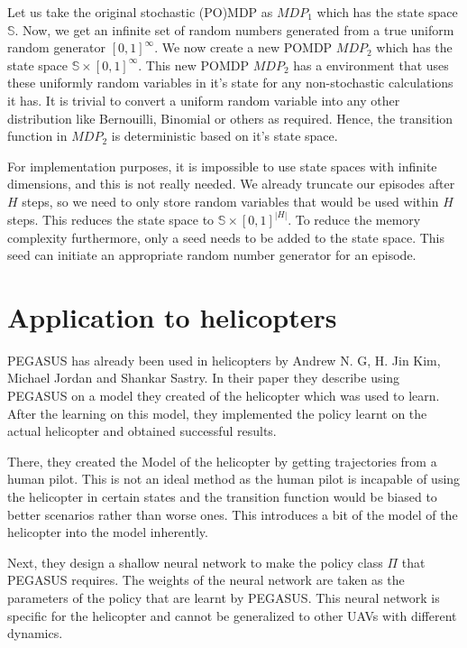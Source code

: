 \documentclass[BTech]{iitmdiss}
\begin{document}
Let us take the original stochastic (PO)MDP as $MDP_{1}$ which has the state space $\mathbb{S}$. Now, we get an infinite set of random numbers generated from a true uniform random generator $[0,1]^{\infty}$. We now create a new POMDP $MDP_{2}$ which has the state space $\mathbb{S} \times [0,1]^{\infty}$. This new POMDP $MDP_{2}$ has a environment that uses these uniformly random variables in it's state for any non-stochastic calculations it has. It is trivial to convert a uniform random variable into any other distribution like Bernouilli, Binomial or others as required. Hence, the transition function in $MDP_{2}$ is deterministic based on it's state space.

For implementation purposes, it is impossible to use state spaces with infinite dimensions, and this is not really needed. We already truncate our episodes after $H$ steps, so we need to only store random variables that would be used within $H$ steps. This reduces the state space to $\mathbb{S} \times [0,1]^{|H|}$. To reduce the memory complexity furthermore, only a seed needs to be added to the state space. This seed can initiate an appropriate random number generator for an episode.

\section{Application to helicopters}

PEGASUS has already been used in helicopters \cite{HelicopterPegasus}  by Andrew N. G, H. Jin Kim, Michael Jordan and Shankar Sastry. In their paper they describe using PEGASUS on a model they created of the helicopter which was used to learn. After the learning on this model, they implemented the policy learnt on the actual helicopter and obtained successful results.

There, they created the Model of the helicopter by getting trajectories from a human pilot. This is not an ideal method as the human pilot is incapable of using the helicopter in certain states and the transition function would be biased to better scenarios rather than worse ones. This introduces a bit of the model of the helicopter into the model inherently.

Next, they design a shallow neural network to make the policy class $\Pi$ that PEGASUS requires. The weights of the neural network are taken as the parameters of the policy that are learnt by PEGASUS. This neural network is specific for the helicopter and cannot be generalized to other UAVs with different dynamics.
\end{document}
